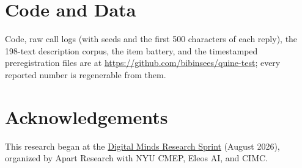 \documentclass[11pt]{article}
\begin{document}
\section*{Code and Data}
Code, raw call logs (with seeds and the first 500 characters of each reply), the 198-text description
corpus, the item battery, and the timestamped preregistration files are at
\url{https://github.com/bibinsees/quine-test}; every reported number is
regenerable from them.

\section*{Acknowledgements}
This research began at the
\href{https://apartresearch.com/sprints/digital-minds-research-sprint-2026-08-14-to-2026-08-16}{Digital
Minds Research Sprint} (August 2026), organized by Apart Research with NYU
CMEP, Eleos AI, and CIMC.
\end{document}
